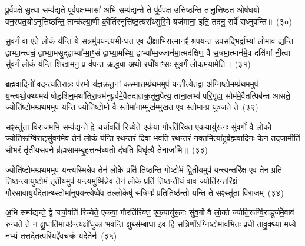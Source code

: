 पू॒र्व॒प॒क्षे सु॒त्या सम्प॑द्यते पूर्वप॒क्षम्मासा॑ अ॒भि सम्प॑द्यन्ते॒ ते पू᳚र्वप॒क्ष उत्ति॑ष्ठन्ति॒ तानु॒त्तिष्ठ॑त॒ ओष॑धयो॒ वन॒स्पत॒यो\-ऽनूत्ति॑ष्ठन्ति॒ तान्क॑ल्या॒णी की॒र्तिरनूत्ति॑ष्ठ॒त्यरा᳚थ्सुरि॒मे यज॑माना॒ इति॒ तदनु॒ सर्वे॑ राध्नुवन्ति॥~(३०)

{\anuvakamend[{ए॒तच्छ॒म्बट्कु॑र्वन्ति॒ तेषा॒ञ्चतु॑स्त्रिꣳशच्च}]}%

सु॒व॒र्गं वा ए॒ते लो॒कं य॑न्ति॒ ये स॒त्रमु॑प॒यन्त्य॒भीन्ध॑त ए॒व दी॒क्षाभि॑रा॒त्मानꣴ॑ श्रपयन्त उप॒सद्भि॒र्द्वाभ्यां॒ लोमाव॑ द्यन्ति॒ द्वाभ्या॒न्त्वचं॒ द्वाभ्या॒मसृ॒द्द्वाभ्या᳚म्मा॒ꣳ॒सं द्वाभ्या॒मस्थि॒ द्वाभ्या᳚म्म॒ज्जान॑मा॒त्मद॑क्षिणं॒ वै स॒त्रमा॒त्मान॑मे॒व दक्षि॑णां नी॒त्वा सु॑व॒र्गं लो॒कं य॑न्ति॒ शिखा॒मनु॒ प्र व॑पन्त॒ ऋद्ध्या॒ अथो॒ रघी॑याꣳसः सुव॒र्गं लो॒कम॑या॒मेति॑॥~(३१)

{\anuvakamend[{सु॒व॒र्गम्प॑ञ्चा॒शत्}]}%

ब्र॒ह्म॒वा॒दिनो॑ वदन्त्यतिरा॒त्रः प॑र॒मो य॑ज्ञक्रतू॒नां कस्मा॒त्तम्प्र॑थ॒ममुप॑ य॒न्तीत्ये॒तद्वा अ॑ग्निष्टो॒मम्प्र॑थ॒ममुप॑ य॒न्त्यथो॒क्थ्य॑मथ॑ षोड॒शिन॒मथा॑तिरा॒त्रम॑नुपू॒र्वमे॒वैतद्य॑ज्ञक्र॒तूनु॒पेत्य॒ ताना॒लभ्य॑ परि॒गृह्य॒ सोम॑मे॒वैतत्पिब॑न्त आसते॒ ज्योति॑ष्टोमम्प्रथ॒ममुप॑ यन्ति॒ ज्योति॑ष्टोमो॒ वै स्तोमा॑ना॒म्मुख॑म्मुख॒त ए॒व स्तोमा॒न्प्र यु॑ञ्जते॒ ते~(३२)

सꣴस्तु॑ता वि॒राज॑म॒भि सम्प॑द्यन्ते॒ द्वे चर्चा॒वति॑ रिच्येते॒ एक॑या॒ गौरति॑रिक्त॒ एक॒यायु॑रू॒नः सु॑व॒र्गो वै लो॒को ज्योति॒रूर्ग्वि॒राट्सु॑व॒र्गमे॒व तेन॑ लो॒कं य॑न्ति रथन्त॒रं दिवा॒ भव॑ति रथन्त॒रं नक्त॒मित्या॑हुर्ब्रह्मवा॒दिनः॒ केन॒ तदजा॒मीति॑ सौभ॒रं तृ॑तीयसव॒ने ब्र॑ह्मसा॒मम्बृ॒हत्तन्म॑ध्य॒तो द॑धति॒ विधृ॑त्यै॒ तेनाजा॑मि॥~(३३)

{\anuvakamend[{त एका॒न्नप॑ञ्चा॒शच्च॑}]}%

ज्योति॑ष्टोमम्प्रथ॒ममुप॑ यन्त्य॒स्मिन्ने॒व तेन॑ लो॒के प्रति॑ तिष्ठन्ति॒ गोष्टो॑मं द्वि॒तीय॒मुप॑ यन्त्य॒न्तरि॑क्ष ए॒व तेन॒ प्रति॑ तिष्ठ॒न्त्यायु॑ष्टोमं तृ॒तीय॒मुप॑ यन्त्य॒मुष्मि॑न्ने॒व तेन॑ लो॒के प्रति॑ तिष्ठन्ती॒यं वाव ज्योति॑र॒न्तरि॑क्षं॒ गौर॒सावायु॒र्यदे॒तान्थ्स्तोमा॑नुप॒यन्त्ये॒ष्वे॑व तल्लो॒केषु॑ स॒त्रिणः॑ प्रति॒तिष्ठ॑न्तो यन्ति॒ ते सꣴस्तु॑ता वि॒राजम्᳚~(३४)

अ॒भि सम्प॑द्यन्ते॒ द्वे चर्चा॒वति॑ रिच्येते॒ एक॑या॒ गौरति॑रिक्त॒ एक॒यायु॑रू॒नः सु॑व॒र्गो वै लो॒को ज्योति॒रूर्ग्वि॒राडूर्ज॑मे॒वाव॑ रुन्धते॒ ते न क्षु॒धार्ति॒मार्च्छ॒न्त्यक्षो॑धुका भवन्ति॒ क्षुथ्स॑म्बाधा इव॒ हि स॒त्रिणो᳚\-ऽग्निष्टो॒माव॒भितः॑ प्र॒धी तावु॒क्थ्या॑ मध्ये॒ नभ्यं॒ तत्तदे॒तत्प॑रि॒यद्दे॑वच॒क्रं यदे॒तेन॑~(३५)

